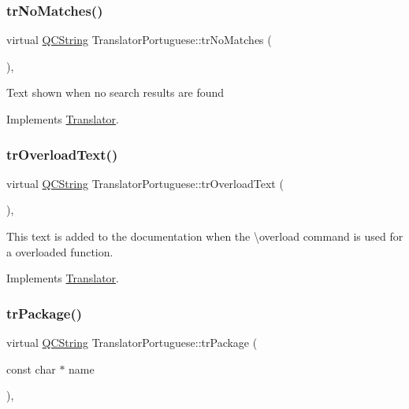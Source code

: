 \subsubsection{\texorpdfstring{trNoMatches()}{trNoMatches()}}
{\footnotesize\ttfamily virtual \mbox{\hyperlink{class_q_c_string}{Q\+C\+String}} Translator\+Portuguese\+::tr\+No\+Matches (\begin{DoxyParamCaption}{ }\end{DoxyParamCaption})\hspace{0.3cm}{\ttfamily [inline]}, {\ttfamily [virtual]}}

Text shown when no search results are found 

Implements \mbox{\hyperlink{class_translator}{Translator}}.

\mbox{\label{class_translator_portuguese_a321dbe0ca379b243532329d3e01a4489}} 
\subsubsection{\texorpdfstring{trOverloadText()}{trOverloadText()}}
{\footnotesize\ttfamily virtual \mbox{\hyperlink{class_q_c_string}{Q\+C\+String}} Translator\+Portuguese\+::tr\+Overload\+Text (\begin{DoxyParamCaption}{ }\end{DoxyParamCaption})\hspace{0.3cm}{\ttfamily [inline]}, {\ttfamily [virtual]}}

This text is added to the documentation when the \textbackslash{}overload command is used for a overloaded function. 

Implements \mbox{\hyperlink{class_translator}{Translator}}.

\mbox{\label{class_translator_portuguese_aa101d0a9b7ca00a4775ac06bf7d9d402}} 
\subsubsection{\texorpdfstring{trPackage()}{trPackage()}}
{\footnotesize\ttfamily virtual \mbox{\hyperlink{class_q_c_string}{Q\+C\+String}} Translator\+Portuguese\+::tr\+Package (\begin{DoxyParamCaption}\item[{const char $\ast$}]{name }\end{DoxyParamCaption})\hspace{0.3cm}{\ttfamily [inline]}, {\ttfamily [virtual]}}

